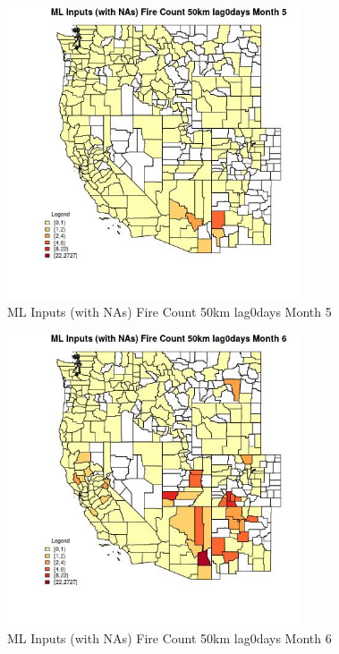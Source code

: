 \begin{figure} 
\centering  
\includegraphics[width=0.77\textwidth]{Code_Outputs/Report_ML_input_PM25_Step4_part_f_de_duplicated_aves_prioritize_24hr_obswNAs_CountyFire_Count_50km_lag0daysmedianMonth5.jpg} 
\caption{\label{fig:Report_ML_input_PM25_Step4_part_f_de_duplicated_aves_prioritize_24hr_obswNAsCountyFire_Count_50km_lag0daysmedianMonth5}ML Inputs (with NAs) Fire Count 50km lag0days Month 5} 
\end{figure} 
 

\begin{figure} 
\centering  
\includegraphics[width=0.77\textwidth]{Code_Outputs/Report_ML_input_PM25_Step4_part_f_de_duplicated_aves_prioritize_24hr_obswNAs_CountyFire_Count_50km_lag0daysmedianMonth6.jpg} 
\caption{\label{fig:Report_ML_input_PM25_Step4_part_f_de_duplicated_aves_prioritize_24hr_obswNAsCountyFire_Count_50km_lag0daysmedianMonth6}ML Inputs (with NAs) Fire Count 50km lag0days Month 6} 
\end{figure} 
 


